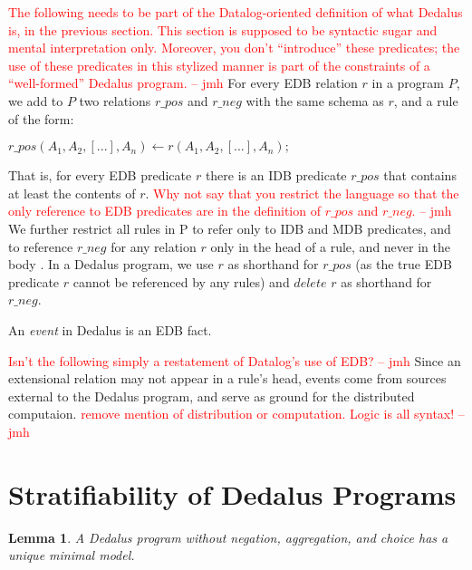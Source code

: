 \documentclass{acm_proc_article-sp-sigmod09}
\newcommand{\jmh}[1]{{\textcolor{red}{#1 -- jmh}}}
\newcommand{\paa}[1]{{\textcolor{blue}{#1 -- paa}}}
\newcommand{\wrm}[1]{{\color{BurntOrange}{#1 -- wrm}}}
\begin{document}
\jmh{The following needs to be part of the Datalog-oriented definition of what Dedalus is, in the previous section.  This section is supposed to be syntactic sugar and mental interpretation only.  Moreover, you don't ``introduce'' these predicates; the use of these predicates in this stylized manner is part of the constraints of a ``well-formed'' Dedalus program.}
For every EDB relation $r$ in a program $P$, we add to $P$ two relations
$r\_pos$ and $r\_neg$ with the same schema as $r$, and a rule of the form:

$r\_pos(A_1, A_2, [...], A_n) \leftarrow r(A_1, A_2, [...], A_n);$

\wrm{Are we missing the time suffixes here?} That is, for every EDB predicate
$r$ there is an IDB predicate $r\_pos$ that contains at least the contents of
$r$.  
\jmh{Why not say that you restrict the language so that the only reference to EDB predicates are in the definition of $r\_pos$ and $r\_neg$.}
We further restrict all rules in P to refer only to IDB and MDB
predicates, and to reference $r\_neg$ for any relation $r$ only in the head of
a rule, and never in the body \wrm{then, how do we write persistence rules?}.
In a Dedalus program, we use $r$ as shorthand for $r\_pos$ (as the true EDB
predicate $r$ cannot be referenced by any rules) and $delete$ $r$ as shorthand
for $r\_neg$.

\begin{definition}
%
An \emph{event} in Dedalus is an EDB fact.
%
\end{definition}

\jmh{Isn't the following simply a restatement of Datalog's use of EDB?}
Since an extensional relation may not appear in a rule's head, events come from
sources external to the Dedalus program, and serve as ground for the
distributed computaion.  \jmh{remove mention of distribution or computation.  Logic is all syntax!}

\section{Stratifiability of Dedalus Programs}

\newtheorem{lemma}{Lemma} 

\begin{lemma} 
%
A Dedalus program without negation, aggregation, and choice has a unique
minimal model.
%
\end{lemma}
\end{document}
